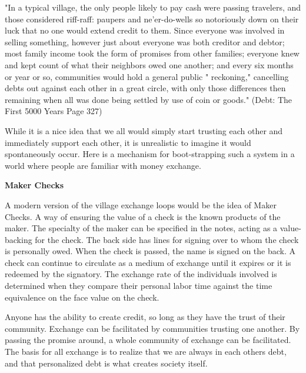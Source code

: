 \documentclass{article}
\begin{document}
\begin{minipage}[t]{0.72\textwidth}
	\vspace{0pt}
	"In a typical village, the only people likely to pay cash were passing
	travelers, and those considered riff-raff: paupers and ne'er-do-wells so
	notoriously down on their luck that no one would extend credit to
	them. Since everyone was involved in selling something, however just
	about everyone was both creditor and debtor; most family income took
	the form of promises from other families; everyone knew and kept
	count of what their neighbors owed one another; and every six months
	or year or so, communities would hold a general public " reckoning,"
	cancelling debts out against each other in a great circle, with only those
	differences then remaining when all was done being settled by use of
	coin or goods." (Debt: The First 5000 Years Page 327)
	
	\vspace{0.2cm}
	
	While it is a nice idea that we all would simply start trusting each other and immediately support each other, it is unrealistic to imagine it would spontaneously occur. Here is a mechanism for boot-strapping such a system in a world where people are familiar with money exchange. 
	
{\centering \textbf{Maker Checks}\par}
	
	A modern version of the village exchange loops would be the idea of Maker Checks. A way of ensuring the value of a check is the known products of the maker. The specialty of the maker can be specified in the notes, acting as a value-backing for the check. The back side has lines for signing over to whom the check is personally owed. When the check is passed, the name is signed on the back. A check can continue to circulate as a medium of exchange until it expires or it is redeemed by the signatory. The exchange rate of the individuals involved is determined when they compare their personal labor time against the time equivalence on the face value on the check.
	
	Anyone has the ability to create credit, so long as they have the trust of their community. Exchange can be facilitated by communities trusting one another. By passing the promise around, a whole community of exchange can be facilitated. The  basis for all exchange is to realize that we are always in each others debt, and that personalized debt is what creates society itself. 
	
	

\end{minipage}%
\end{document}
